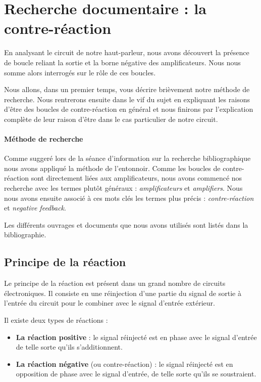 

\section{Recherche documentaire : la contre-réaction}
En analysant le circuit de notre haut-parleur, nous avons découvert la présence de boucle reliant la sortie et la borne négative des amplificateurs. Nous nous somme alors interrogés sur le rôle de ces boucles.

Nous allons, dans un premier temps, vous décrire brièvement notre méthode de recherche. Nous rentrerons ensuite dans le vif du sujet en expliquant les raisons d'être des boucles de contre-réaction en général et nous finirons par l'explication complète de leur raison d'être dans le cas particulier de notre circuit.

\paragraph{Méthode de recherche}
Comme suggeré lors de la séance d'information sur la recherche bibliographique nous avons appliqué la méthode de l'entonnoir. Comme les boucles de contre-réaction sont directement liées aux amplificateurs, nous avons commencé nos recherche avec les termes plutôt généraux : \textit{amplificateurs} et \textit{amplifiers}. Nous nous avons ensuite associé à ces mots clés les termes plus précis : \textit{contre-réaction} et \textit{negative feedback}.

Les différents ouvrages et documents que nous avons utilisés sont listés dans la bibliographie.

\subsection{Principe de la réaction}
Le principe de la réaction est présent dans un grand nombre de circuits électroniques. Il consiste en une réinjection d'une partie du signal de sortie à l'entrée du circuit pour le combiner avec le signal d'entrée extérieur.

Il existe deux types de réactions :

\begin{itemize}
	\item \textbf{La réaction positive} : le signal réinjecté est en phase avec le signal d'entrée de telle sorte qu'ils  s'additionnent.
	\item \textbf{La réaction négative} (ou contre-réaction) : le signal réinjecté est en opposition de phase avec le signal d'entrée, de telle sorte qu'ils se soustraient.
\end{itemize}

